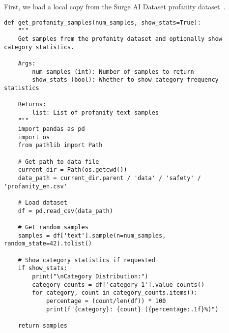 First, we load a local copy from the Surge AI Dataset profanity dataset~.

\begin{verbatim}
def get_profanity_samples(num_samples, show_stats=True):
    """
    Get samples from the profanity dataset and optionally show category statistics.
    
    Args:
        num_samples (int): Number of samples to return
        show_stats (bool): Whether to show category frequency statistics
        
    Returns:
        list: List of profanity text samples
    """
    import pandas as pd
    import os
    from pathlib import Path
    
    # Get path to data file
    current_dir = Path(os.getcwd())
    data_path = current_dir.parent / 'data' / 'safety' / 'profanity_en.csv'
    
    # Load dataset
    df = pd.read_csv(data_path)
    
    # Get random samples
    samples = df['text'].sample(n=num_samples, random_state=42).tolist()
    
    # Show category statistics if requested
    if show_stats:
        print("\nCategory Distribution:")
        category_counts = df['category_1'].value_counts()
        for category, count in category_counts.items():
            percentage = (count/len(df)) * 100
            print(f"{category}: {count} ({percentage:.1f}%)")
            
    return samples
\end{verbatim}

